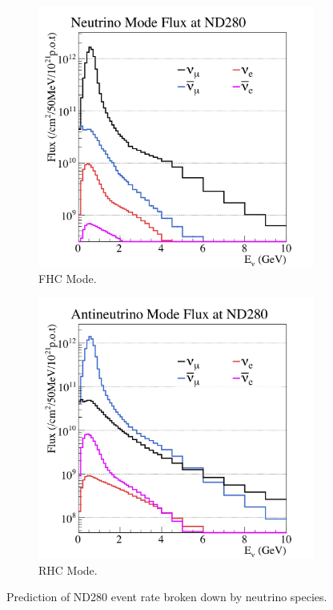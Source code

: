 \begin{figure}
\centering
\begin{subfigure}{.5\textwidth}
  \centering
  \includegraphics[width=.9\linewidth]{figs/nd5_alltunedflux_run1-9a_zoomed_13a}
  \caption{FHC Mode.}
  \label{fig:fhcmode}
\end{subfigure}%
\begin{subfigure}{.5\textwidth}
  \centering
  \includegraphics[width=.9\linewidth]{figs/nd5_alltunedflux_run5c-9c_zoomed_antinu_13a}
  \caption{RHC Mode.}
  \label{fig:rhcmode}
\end{subfigure}
\caption{Prediction of ND280 event rate broken down by neutrino species.}
\label{fig:modebreakdown}
\end{figure}

